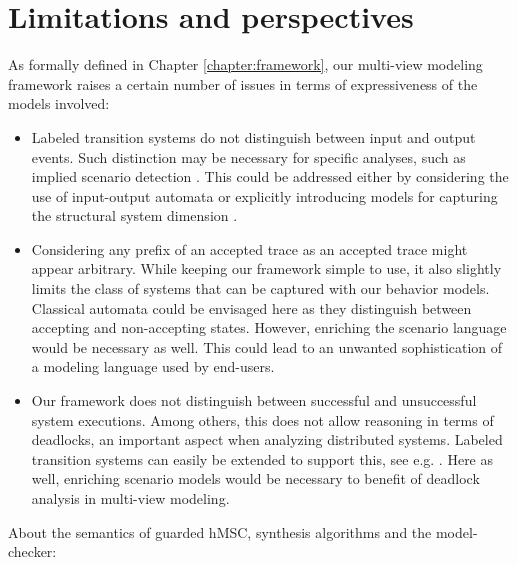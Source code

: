 \section{Limitations and perspectives\label{section:conclusion-limitations}}

As formally defined in Chapter \ref{chapter:framework}, our multi-view modeling framework raises a certain number of issues in terms of expressiveness of the models involved:

\begin{itemize}

\item Labeled transition systems do not distinguish between input and output events. Such distinction may be necessary for specific analyses, such as implied scenario detection \cite{Letier:2005b}. This could be addressed either by considering the use of input-output automata \cite{Lynch:1987} or explicitly introducing models for capturing the structural system dimension \cite{Jackson:1995, Magee:1995}.

\item Considering any prefix of an accepted trace as an accepted trace might appear arbitrary. While keeping our framework simple to use, it also slightly limits the class of systems that can be captured with our behavior models. Classical automata could be envisaged here as they distinguish between accepting and non-accepting states. However, enriching the scenario language would be necessary as well. This could lead to an unwanted sophistication of a modeling language used by end-users.

\item Our framework does not distinguish between successful and unsuccessful system executions. Among others, this does not allow reasoning in terms of deadlocks, an important aspect when analyzing distributed systems. Labeled transition systems can easily be extended to support this, see e.g. \cite{Uchitel:2003}. Here as well, enriching scenario models would be necessary to benefit of deadlock analysis in multi-view modeling.

\end{itemize}

About the semantics of guarded hMSC, synthesis algorithms and the model-checker:

